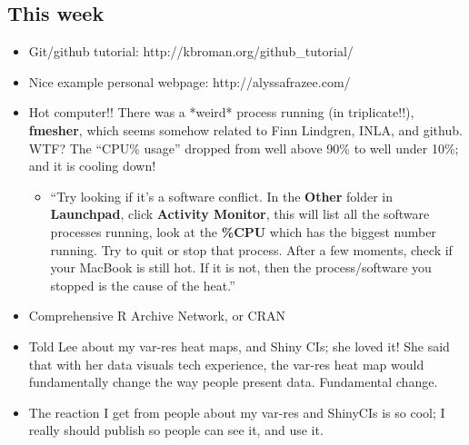 \documentclass{article}
\begin{document}
\subsection{This week}
\begin{itemize}
\item Git/github tutorial: http://kbroman.org/github\_tutorial/
\item Nice example personal webpage: http://alyssafrazee.com/
\item Hot computer!! There was a *weird* process running (in triplicate!!), {\bf fmesher}, which seems somehow related to Finn Lindgren, INLA, and github. WTF? The ``CPU\% usage'' dropped from well above 90\% to well under 10\%; and it is cooling down!
  \begin{itemize}
  \item ``Try looking if it's a software conflict. In the {\bf Other} folder in {\bf Launchpad}, click {\bf Activity Monitor}, this will list all the software processes running, look at the {\bf \%CPU} which has the biggest number running. Try to quit or stop that process. After a few moments, check if your MacBook is still hot. If it is not, then the process/software you stopped is the cause of the heat.''
  \end{itemize}
\item Comprehensive R Archive Network, or CRAN
\item Told Lee about my var-res heat maps, and Shiny CIs; she loved it! She said that with her data visuals tech experience, the var-res heat map would fundamentally change the way people present data. Fundamental change.
\item The reaction I get from people about my var-res and ShinyCIs is so cool; I really should publish so people can see it, and use it.
\end{itemize}
\end{document}
